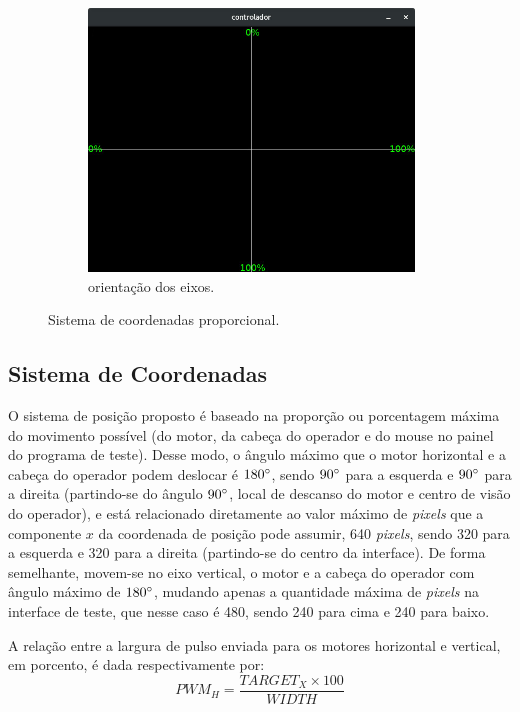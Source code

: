 \begin{figure}[H]
	\begin{subfigure}{.5\textwidth}
		\includegraphics[width=0.95\textwidth]{figuras/controlador-values.jpg}
		\caption{orientação dos eixos.}
		\label{fig:sistcoord}
	\end{subfigure}
	\caption{Sistema de coordenadas proporcional.}
\end{figure}

\subsection{Sistema de Coordenadas}
\label{subsec:sistemacoordenadas}

O sistema de posição proposto é baseado na proporção ou porcentagem máxima do movimento possível (do motor, da cabeça do operador e do mouse no painel do programa de teste). Desse modo, o ângulo máximo que o motor horizontal e a cabeça do operador podem deslocar é $180\degree$, sendo $90\degree$ para a esquerda e $90\degree$ para a direita (partindo-se do ângulo $90\degree$, local de descanso do motor e centro de visão do operador), e está relacionado diretamente ao valor máximo de \textit{pixels} que a componente $x$ da coordenada de posição pode assumir, 640 \textit{pixels}, sendo 320 para a esquerda e 320 para a direita (partindo-se do centro da interface). De forma semelhante, movem-se no eixo vertical, o motor e a cabeça do operador com ângulo máximo de $180\degree$, mudando apenas a quantidade máxima de \textit{pixels} na interface de teste, que nesse caso é 480, sendo 240 para cima e 240 para baixo.\par
A relação entre a largura de pulso enviada para os motores horizontal e vertical, em porcento, é dada respectivamente por:
\begin{equation}
	PWM_H = \frac{TARGET_X \times 100}{WIDTH}
	\label{eq:pwm_screen_h}
\end{equation}

